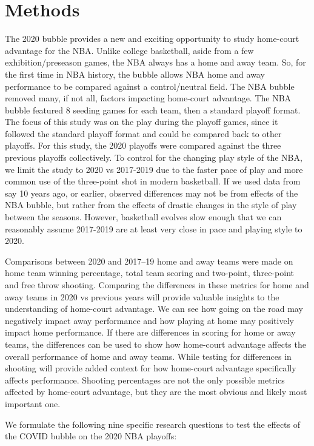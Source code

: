 \documentclass[10pt]{article}
\begin{document}
\section{Methods}

The 2020 bubble provides a new and exciting opportunity to study home-court
advantage for the NBA. Unlike college basketball, aside from a few
exhibition/preseason games, the NBA always has a home and away team. So, for
the first time in NBA history, the bubble allows NBA home and away performance
to be compared against a control/neutral field. The NBA bubble
removed many, if not all, factors impacting home-court advantage. The NBA 
bubble featured 8 seeding games for each team, then a
standard playoff format. The focus of this study was on the play during the playoff
games, since it followed the standard playoff format and could be compared
back to other playoffs. For this study, the 2020 playoffs were compared against
the three previous playoffs collectively. To control
for the changing play style of the NBA, we limit the study to 2020 vs 2017-2019
due to the faster pace of play and more common use of the three-point shot
in modern basketball. If we used data from say 10 years ago, or earlier, observed
differences may not be from effects of the NBA bubble, but rather from the effects
of drastic changes in the style of play between the seasons. However, basketball
evolves slow enough that we can reasonably assume 2017-2019 are at least very
close in pace and playing style to 2020.

Comparisons between 2020 and 2017--19 home and away teams were made on home team
winning percentage, total team scoring and two-point, three-point and free throw
shooting. Comparing the differences in these metrics for home and away teams in
2020 vs previous years will provide valuable insights to the understanding of
home-court advantage. We can see how going on the road may negatively impact
away performance and how playing at home may positively impact home performance.
If there are differences in scoring for home or away teams, the differences can
be used to show how home-court advantage affects the overall performance of home
and away teams. While testing for differences in shooting will provide added
context for how home-court advantage specifically affects performance.
Shooting percentages are not the only possible metrics affected by home-court
advantage, but they are the most obvious and likely most important one.

We formulate the following nine specific research questions to test
the effects of the COVID bubble on the 2020 NBA playoffs:
\end{document}
